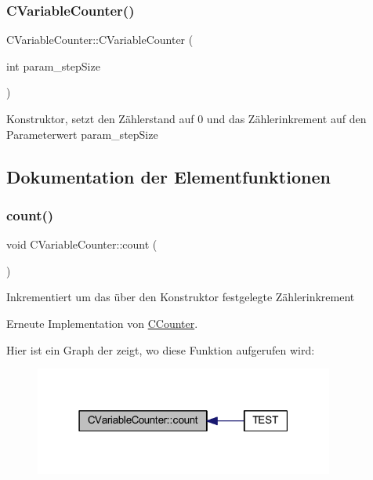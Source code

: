 \subsubsection{\texorpdfstring{C\+Variable\+Counter()}{CVariableCounter()}\hspace{0.1cm}{\footnotesize\ttfamily [2/2]}}
{\footnotesize\ttfamily C\+Variable\+Counter\+::\+C\+Variable\+Counter (\begin{DoxyParamCaption}\item[{int}]{param\+\_\+step\+Size }\end{DoxyParamCaption})}

Konstruktor, setzt den Zählerstand auf 0 und das Zählerinkrement auf den Parameterwert param\+\_\+step\+Size 

\subsection{Dokumentation der Elementfunktionen}
\mbox{\label{class_c_variable_counter_a693c27202acd18d53c4642ce642927bc}} 
\subsubsection{\texorpdfstring{count()}{count()}}
{\footnotesize\ttfamily void C\+Variable\+Counter\+::count (\begin{DoxyParamCaption}{ }\end{DoxyParamCaption})\hspace{0.3cm}{\ttfamily [virtual]}}

Inkrementiert um das über den Konstruktor festgelegte Zählerinkrement 

Erneute Implementation von \hyperlink{class_c_counter_a90f3e164f3fc1dcf91044702d6940c4d}{C\+Counter}.

Hier ist ein Graph der zeigt, wo diese Funktion aufgerufen wird\+:
\nopagebreak
\begin{figure}[H]
\begin{center}
\leavevmode
\includegraphics[width=279pt]{class_c_variable_counter_a693c27202acd18d53c4642ce642927bc_icgraph}
\end{center}
\end{figure}


